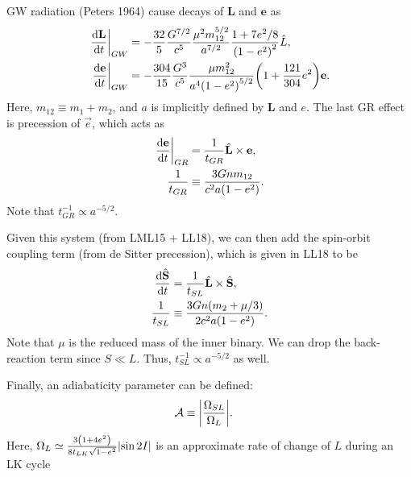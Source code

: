 \documentclass[11pt,
        usenames, %
        dvipsnames %
    ]{article}
\newcommand*{\rd}[2]{\frac{\mathrm{d}#1}{\mathrm{d}#2}}
\newcommand*{\bm}[1]{\boldsymbol{\mathbf{#1}}}
\newcommand*{\at}[1]{\left.#1\right|}
\DeclarePairedDelimiter\abs{\lvert}{\rvert}
\DeclarePairedDelimiter\p{\lparen}{\rparen}
\begin{document}
GW radiation (Peters 1964) cause decays of $\bm{L}$ and $\bm{e}$ as
\begin{align}
    \at{\rd{\bm{L}}{t}}_{GW} &= -\frac{32}{5}\frac{G^{7/2}}{c^5}
        \frac{\mu^2 m_{12}^{5/2}}{a^{7/2}}
        \frac{1 + 7e^2/8}{\p*{1 - e^2}^2}\hat{L},\\
    \at{\rd{\bm{e}}{t}}_{GW} &= -\frac{304}{15} \frac{G^3}{c^5}
        \frac{\mu m_{12}^2}{a^4\p*{1 - e^2}^{5/2}}\p*{1 + \frac{121}{304}
            e^2}\bm{e}.
\end{align}
Here, $m_{12} \equiv m_1 + m_2$, and $a$ is implicitly defined by $\bm{L}$ and
$e$. The last GR effect is precession of $\vec{e}$, which acts as
\begin{align}
    \at{\rd{\bm{e}}{t}}_{GR} &= \frac{1}{t_{GR}}\hat{\bm{L}} \times \bm{e},\\
    \frac{1}{t_{GR}} &\equiv \frac{3Gnm_{12}}{c^2a\p*{1 - e^2}}.
\end{align}
Note that $t_{GR}^{-1} \propto a^{-5/2}$.

Given this system (from LML15 + LL18), we can then add the spin-orbit coupling
term (from de Sitter precession), which is given in LL18 to be
\begin{align}
    \rd{\hat{\bm{S}}}{t} &= \frac{1}{t_{SL}}\hat{\bm{L}} \times \hat{\bm{S}},\\
    \frac{1}{t_{SL}} &\equiv \frac{3Gn\p*{m_2 + \mu/3}}{2c^2a\p*{1 - e^2}}.
\end{align}
Note that $\mu$ is the reduced mass of the inner binary. We can drop the
back-reaction term since $S \ll L$. Thus, $t_{SL}^{-1} \propto a^{-5/2}$ as
well.

Finally, an adiabaticity parameter can be defined:
\begin{align}
    \mathcal{A} &\equiv \abs*{\frac{\Omega_{SL}}{\Omega_L}}.
\end{align}
Here, $\Omega_L \simeq\frac{3\p*{1 + 4e^2}}{8t_{LK}\sqrt{1 - e^2}}\abs*{\sin
2I}$ is an approximate rate of change of $L$ during an LK cycle
\end{document}
